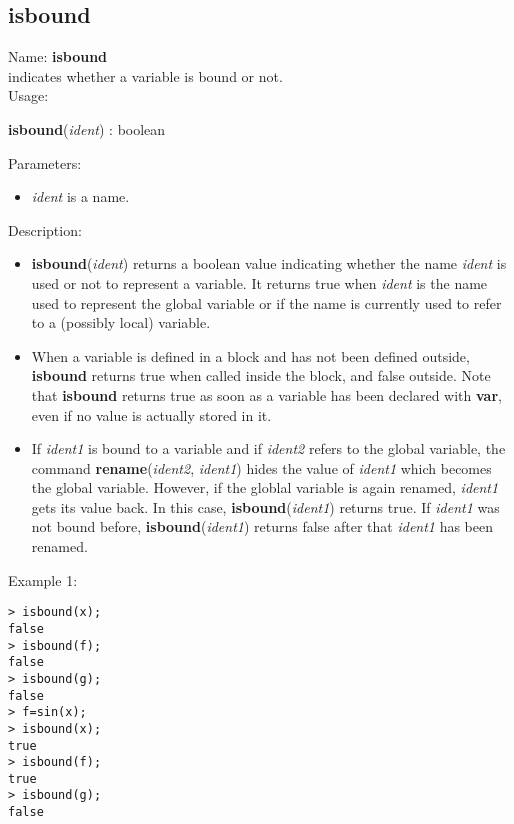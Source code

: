 \subsection{isbound}
\label{labisbound}
\noindent Name: \textbf{isbound}\\
indicates whether a variable is bound or not.\\

\noindent Usage: 
\begin{center}
\textbf{isbound}(\emph{ident}) : \textsf{boolean}\\
\end{center}
Parameters: 
\begin{itemize}
\item \emph{ident} is a name.
\end{itemize}
\noindent Description: \begin{itemize}

\item \textbf{isbound}(\emph{ident}) returns a boolean value indicating whether the name \emph{ident}
   is used or not to represent a variable. It returns true when \emph{ident} is the 
   name used to represent the global variable or if the name is currently used
   to refer to a (possibly local) variable.

\item When a variable is defined in a block and has not been defined outside, 
   \textbf{isbound} returns true when called inside the block, and false outside.
   Note that \textbf{isbound} returns true as soon as a variable has been declared with 
   \textbf{var}, even if no value is actually stored in it.

\item If \emph{ident1} is bound to a variable and if \emph{ident2} refers to the global 
   variable, the command \textbf{rename}(\emph{ident2}, \emph{ident1}) hides the value of \emph{ident1}
   which becomes the global variable. However, if the globlal variable is again
   renamed, \emph{ident1} gets its value back. In this case, \textbf{isbound}(\emph{ident1}) returns
   true. If \emph{ident1} was not bound before, \textbf{isbound}(\emph{ident1}) returns false after
   that \emph{ident1} has been renamed.
\end{itemize}
\noindent Example 1: 
\begin{center}\begin{minipage}{15cm}\begin{Verbatim}[frame=single]
> isbound(x);
false
> isbound(f);
false
> isbound(g);
false
> f=sin(x);
> isbound(x);
true
> isbound(f);
true
> isbound(g);
false
\end{Verbatim}
\end{minipage}\end{center}
